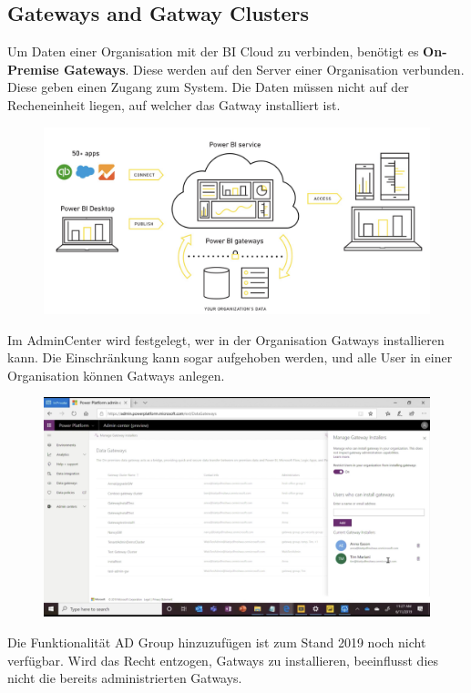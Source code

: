 \subsection{Gateways and Gatway Clusters}
Um Daten einer Organisation mit der BI Cloud zu verbinden, benötigt es \textbf{On-Premise Gateways}. Diese werden auf den Server einer Organisation verbunden. Diese geben einen Zugang zum System. Die Daten müssen nicht auf der Recheneinheit liegen, auf welcher das Gatway installiert ist.
\begin{figure}[H]
	\centering
	\includegraphics[scale = 0.3]{attachment/chapter_1/Scc128}
\end{figure}
Im AdminCenter wird festgelegt, wer in der Organisation Gatways installieren kann.
Die Einschränkung kann sogar aufgehoben werden, und alle User in einer Organisation können Gatways anlegen.

\begin{figure}[H]
	\centering
	\includegraphics[scale = 0.3]{attachment/chapter_1/Scc129}
\end{figure}
Die Funktionalität \gls{AD} Group hinzuzufügen ist zum Stand 2019 noch nicht verfügbar. Wird das Recht entzogen, Gatways zu installieren, beeinflusst dies nicht die bereits administrierten Gatways.

